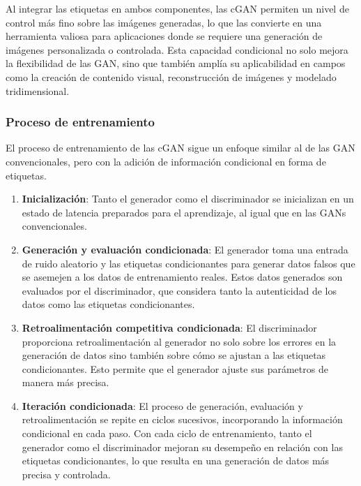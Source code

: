 Al integrar las etiquetas en ambos componentes, las cGAN permiten un nivel de control más fino sobre las imágenes generadas, lo que las convierte en una herramienta valiosa para aplicaciones donde se requiere una generación de imágenes personalizada o controlada. Esta capacidad condicional no solo mejora la flexibilidad de las GAN, sino que también amplía su aplicabilidad en campos como la creación de contenido visual, reconstrucción de imágenes y modelado tridimensional.

\subsubsection{Proceso de entrenamiento}
El proceso de entrenamiento de las cGAN sigue un enfoque similar al de las GAN convencionales, pero con la adición de información condicional en forma de etiquetas.

\begin{enumerate}
    \item \textbf{Inicialización}: Tanto el generador como el discriminador se inicializan en un estado de latencia preparados para el aprendizaje, al igual que en las GANs convencionales.
    
    \item \textbf{Generación y evaluación condicionada}: El generador toma una entrada de ruido aleatorio y las etiquetas condicionantes para generar datos falsos que se asemejen a los datos de entrenamiento reales. Estos datos generados son evaluados por el discriminador, que considera tanto la autenticidad de los datos como las etiquetas condicionantes.
    
    \item \textbf{Retroalimentación competitiva condicionada}: El discriminador proporciona retroalimentación al generador no solo sobre los errores en la generación de datos sino también sobre cómo se ajustan a las etiquetas condicionantes. Esto permite que el generador ajuste sus parámetros de manera más precisa.
    
    \item \textbf{Iteración condicionada}: El proceso de generación, evaluación y retroalimentación se repite en ciclos sucesivos, incorporando la información condicional en cada paso. Con cada ciclo de entrenamiento, tanto el generador como el discriminador mejoran su desempeño en relación con las etiquetas condicionantes, lo que resulta en una generación de datos más precisa y controlada.

\end{enumerate}

